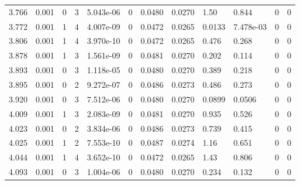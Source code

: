 \documentclass[preview]{standalone}
\begin{document}
{{{\begin{tabular}{L{1.2cm}C{1.2cm} C{0.3cm}C{0.5cm} C{1.4cm}C{1.4cm} C{1.4cm}C{1.4cm} C{1.6cm}C{1.6cm} C{1.6cm}C{1.6cm}}
  3.766  &  0.001  & 0     &  3 &  5.043e-06  & 0  &  0.0480&   0.0270& 1.50 & 0.844   &  0 & 0  \\ 
  3.772  &  0.001  & 1     &  4 &  4.007e-09  & 0  &  0.0472&   0.0265& 0.0133 & 7.478e-03   &  0 & 0  \\ 
  3.806  &  0.001  & 1     &  4 &  3.970e-10  & 0  &  0.0472&   0.0265& 0.476 & 0.268   &  0 & 0  \\ 
  3.878  &  0.001  & 1     &  3 &  1.561e-09  & 0  &  0.0481&   0.0270& 0.202 & 0.114   &  0 & 0  \\ 
  3.893  &  0.001  & 0     &  3 &  1.118e-05  & 0  &  0.0480&   0.0270& 0.389 & 0.218   &  0 & 0  \\ 
  3.895  &  0.001  & 0     &  2 &  9.272e-07  & 0  &  0.0486&   0.0273& 0.486 & 0.273   &  0 & 0  \\ 
  3.920  &  0.001  & 0     &  3 &  7.512e-06  & 0  &  0.0480&   0.0270& 0.0899 & 0.0506   &  0 & 0  \\ 
  4.009  &  0.001  & 1     &  3 &  2.083e-09  & 0  &  0.0481&   0.0270& 0.935 & 0.526   &  0 & 0  \\ 
  4.023  &  0.001  & 0     &  2 &  3.834e-06  & 0  &  0.0486&   0.0273& 0.739 & 0.415   &  0 & 0  \\ 
  4.025  &  0.001  & 1     &  2 &  7.553e-10  & 0  &  0.0487&   0.0274& 1.16 & 0.651   &  0 & 0  \\ 
  4.044  &  0.001  & 1     &  4 &  3.652e-10  & 0  &  0.0472&   0.0265& 1.43 & 0.806   &  0 & 0  \\ 
  4.093  &  0.001  & 0     &  3 &  1.004e-06  & 0  &  0.0480&   0.0270& 0.234 & 0.132   &  0 & 0  \\ 
\hline 
\end{tabular} 

}}}
\end{document}
